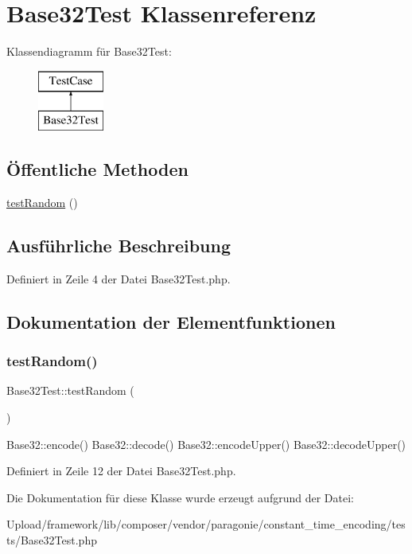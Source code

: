 \hypertarget{class_base32_test}{}\section{Base32\+Test Klassenreferenz}
\label{class_base32_test}
Klassendiagramm für Base32\+Test\+:\begin{figure}[H]
\begin{center}
\leavevmode
\includegraphics[height=2.000000cm]{class_base32_test}
\end{center}
\end{figure}
\subsection*{Öffentliche Methoden}
\begin{DoxyCompactItemize}
\item 
\mbox{\hyperlink{class_base32_test_aeb2f15177858d2d21d0e8225cd66c4dd}{test\+Random}} ()
\end{DoxyCompactItemize}


\subsection{Ausführliche Beschreibung}


Definiert in Zeile 4 der Datei Base32\+Test.\+php.



\subsection{Dokumentation der Elementfunktionen}
\mbox{\label{class_base32_test_aeb2f15177858d2d21d0e8225cd66c4dd}} 
\subsubsection{\texorpdfstring{test\+Random()}{testRandom()}}
{\footnotesize\ttfamily Base32\+Test\+::test\+Random (\begin{DoxyParamCaption}{ }\end{DoxyParamCaption})}

Base32\+::encode()  Base32\+::decode()  Base32\+::encode\+Upper()  Base32\+::decode\+Upper() 

Definiert in Zeile 12 der Datei Base32\+Test.\+php.



Die Dokumentation für diese Klasse wurde erzeugt aufgrund der Datei\+:\begin{DoxyCompactItemize}
\item 
Upload/framework/lib/composer/vendor/paragonie/constant\+\_\+time\+\_\+encoding/tests/Base32\+Test.\+php\end{DoxyCompactItemize}
